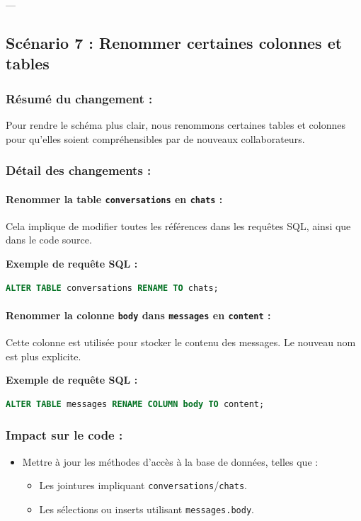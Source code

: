 \documentclass[a4paper,11pt]{article}
\begin{document}
---

\subsection*{Scénario 7 : Renommer certaines colonnes et tables}

\subsubsection*{Résumé du changement :}
Pour rendre le schéma plus clair, nous renommons certaines tables et colonnes pour qu'elles soient compréhensibles par de nouveaux collaborateurs.

\subsubsection*{Détail des changements :}

\paragraph{Renommer la table \texttt{conversations} en \texttt{chats} :}
Cela implique de modifier toutes les références dans les requêtes SQL, ainsi que dans le code source.

\textbf{Exemple de requête SQL :}
\begin{lstlisting}[language=SQL]
ALTER TABLE conversations RENAME TO chats;
\end{lstlisting}

\paragraph{Renommer la colonne \texttt{body} dans \texttt{messages} en \texttt{content} :}
Cette colonne est utilisée pour stocker le contenu des messages. Le nouveau nom est plus explicite.

\textbf{Exemple de requête SQL :}
\begin{lstlisting}[language=SQL]
ALTER TABLE messages RENAME COLUMN body TO content;
\end{lstlisting}

\subsubsection*{Impact sur le code :}
\begin{itemize}
    \item Mettre à jour les méthodes d'accès à la base de données, telles que :
    \begin{itemize}
        \item Les jointures impliquant \texttt{conversations}/\texttt{chats}.
        \item Les sélections ou inserts utilisant \texttt{messages.body}.
    \end{itemize}
\end{itemize}
\end{document}
